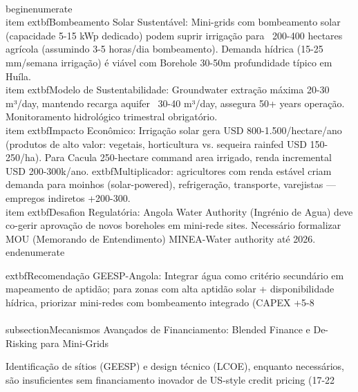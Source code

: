 \documentclass[12pt, a4paper]{article}
\begin{document}
{{{{{{{{{{{\\begin{enumerate}
\\item 	extbf{Bombeamento Solar Sustentável}: Mini-grids com bombeamento solar (capacidade 5-15 kWp dedicado) podem suprir irrigação para ~200-400 hectares agrícola (assumindo 3-5 horas/dia bombeamento). Demanda hídrica (15-25 mm/semana irrigação) é viável com Borehole 30-50m profundidade típico em Huíla.
\\item 	extbf{Modelo de Sustentabilidade}: Groundwater extração máxima 20-30 m³/day, mantendo recarga aquifer ~30-40 m³/day, assegura 50+ years operação. Monitoramento hidrológico trimestral obrigatório.
\\item 	extbf{Impacto Econômico}: Irrigação solar gera USD 800-1.500/hectare/ano (produtos de alto valor: vegetais, horticultura vs. sequeira rainfed USD 150-250/ha). Para Cacula 250-hectare command area irrigado, renda incremental USD 200-300k/ano. 	extbf{Multiplicador}: agricultores com renda estável criam demanda para moinhos (solar-powered), refrigeração, transporte, varejistas — empregos indiretos +200-300.
\\item 	extbf{Desafion Regulatória}: Angola Water Authority (Ingrénio de Agua) deve co-gerir aprovação de novos boreholes em mini-rede sites. Necessário formalizar MOU (Memorando de Entendimento) MINEA-Water authority até 2026.
\\end{enumerate}

	extbf{Recomendação GEESP-Angola}: Integrar água como critério secundário em mapeamento de aptidão; para zonas com alta aptidão solar + disponibilidade hídrica, priorizar mini-redes com bombeamento integrado (CAPEX +5-8\\%

\\subsection{Mecanismos Avançados de Financiamento: Blended Finance e De-Risking para Mini-Grids}

Identificação de sítios (GEESP) e design técnico (LCOE), enquanto necessários, são insuficientes sem financiamento inovador de US-style credit pricing (17-22\\%

}}}}}}}}}}}
\end{document}
